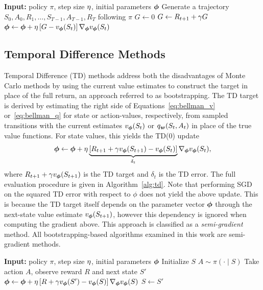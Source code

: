 \begin{algorithm}[htbp]
\caption{Monte Carlo Policy Evaluation}
\label{alg:mc}
\begin{algorithmic}[1]
\State \textbf{Input:} policy $\pi$, step size $\eta$, initial parameters ${\bm \phi}$
    \State Generate a trajectory $S_0, A_0, R_1, \dots, S_{T-1}, A_{T-1}, R_T$ following $\pi$
    \State $G \gets 0$
        \State $G \gets R_{t+1} + \gamma G$
        \State ${\bm \phi} \gets {\bm \phi} + \eta \left[ G - v_{\bm \phi}(S_t) \right] \nabla_{{\bm \phi}} v_{\bm \phi}(S_t)$
    \EndFor
\EndFor
\end{algorithmic}
\end{algorithm}

\FloatBarrier
\subsection{Temporal Difference Methods} \label{subsec:td}
Temporal Difference (TD) methods address both the disadvantages of Monte Carlo methods by using the current value estimates to construct the target in place of the full return, an approach referred to as bootstrapping. The TD target is derived by estimating the right side of Equations~\eqref{eq:bellman_v} or~\eqref{eq:bellman_q} for state or action-values, respectively, from sampled transitions with the current estimates $v_{\bm \phi}(S_t)$ or $q_{\bm w}(S_t, A_t)$ in place of the true value functions. For state values, this yields the TD(0) update
\begin{equation}
    {\bm \phi} \gets {\bm \phi} + \eta \underbrace{\left[ R_{t+1} + \gamma v_{\bm \phi}(S_{t+1}) - v_{\bm \phi}(S_t) \right]}_{\delta_t} \nabla_{{\bm \phi}} v_{\bm \phi}(S_t),
    \label{eq:td_update}
\end{equation}
where $R_{t+1} + \gamma v_{\bm \phi}(S_{t+1})$ is the TD target and $\delta_t$ is the TD error. The full evaluation procedure is given in Algorithm~\ref{alg:td}. Note that performing SGD on the squared TD error with respect to $\phi$ does not yield the above update. This is because the TD target itself depends on the parameter vector ${\bm \phi}$ through the next-state value estimate $v_{\bm \phi}(S_{t+1})$, however this dependency is ignored when computing the gradient above. This approach is classified as a \textit{semi-gradient} method. All bootstrapping-based algorithms examined in this work are semi-gradient methods.

\begin{algorithm}[htbp]
\caption{TD(0) Policy Evaluation}
\label{alg:td}
\begin{algorithmic}[1]
\State \textbf{Input:} policy $\pi$, step size $\eta$, initial parameters ${\bm \phi}$
    \State Initialize $S$
        \State $A \sim \pi(\cdot \mid S)$
        \State Take action $A$, observe reward $R$ and next state $S'$
        \State ${\bm \phi} \gets {\bm \phi} + \eta \left[ R + \gamma v_{\bm \phi}(S') - v_{\bm \phi}(S) \right] \nabla_{{\bm \phi}} v_{\bm \phi}(S)$ 
        \State $S \gets S'$
    \EndWhile
\EndFor
\end{algorithmic}
\end{algorithm}

